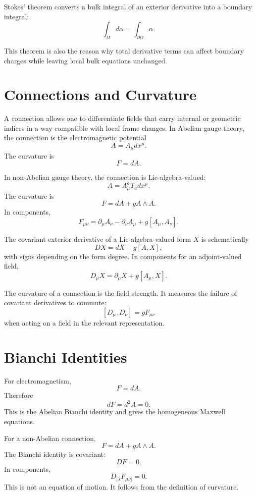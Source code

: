 \begin{definitionbox}
Stokes' theorem converts a bulk integral of an exterior derivative into a
boundary integral:
\[
    \int_\Omega d\alpha=\int_{\partial\Omega}\alpha.
\]
\end{definitionbox}

This theorem is also the reason why total derivative terms can affect boundary
charges while leaving local bulk equations unchanged.

\section{Connections and Curvature}

A connection allows one to differentiate fields that carry internal or geometric
indices in a way compatible with local frame changes. In Abelian gauge theory,
the connection is the electromagnetic potential
\[
    A=A_\mu dx^\mu.
\]
The curvature is
\[
    F=dA.
\]

In non-Abelian gauge theory, the connection is Lie-algebra-valued:
\[
    A=A_\mu^aT_a dx^\mu.
\]
The curvature is
\[
    F=dA+gA\wedge A.
\]
In components,
\[
    F_{\mu\nu}=\partial_\mu A_\nu-\partial_\nu A_\mu+g[A_\mu,A_\nu].
\]

The covariant exterior derivative of a Lie-algebra-valued form \(X\) is
schematically
\[
    DX=dX+g[A,X],
\]
with signs depending on the form degree. In components for an adjoint-valued
field,
\[
    D_\mu X=\partial_\mu X+g[A_\mu,X].
\]

\begin{definitionbox}
The curvature of a connection is the field strength. It measures the failure of
covariant derivatives to commute:
\[
    [D_\mu,D_\nu]=gF_{\mu\nu}
\]
when acting on a field in the relevant representation.
\end{definitionbox}

\section{Bianchi Identities}

For electromagnetism,
\[
    F=dA.
\]
Therefore
\[
    dF=d^2A=0.
\]
This is the Abelian Bianchi identity and gives the homogeneous Maxwell equations.

For a non-Abelian connection,
\[
    F=dA+gA\wedge A.
\]
The Bianchi identity is covariant:
\[
    DF=0.
\]
In components,
\[
    D_{[\lambda}F_{\mu\nu]}=0.
\]
This is not an equation of motion. It follows from the definition of curvature.

